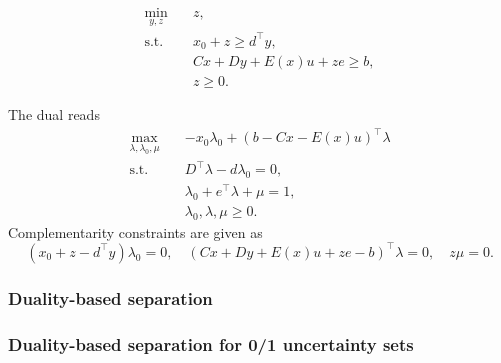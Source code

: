 \begin{subequations}
    \begin{align}
        \min_{y,z} \quad & z, \\
        \text{s.t.} \quad & x_0 + z \ge d^\top y, \\
        & Cx + Dy + E(x)u + ze \ge b, \\
        & z \ge 0.
    \end{align}
\end{subequations}

The dual reads 
\begin{subequations}
    \label{eq:ccg:farkas}
    \begin{align}
        \max_{\lambda,\lambda_0,\mu} \quad & -x_0\lambda_0 + (b - Cx - E(x)u)^\top \lambda \\
        \text{s.t.} \quad & D^\top\lambda - d\lambda_0 = 0, \\
        & \lambda_0 + e^\top\lambda + \mu = 1, \\
        & \lambda_0, \lambda, \mu \ge 0.
    \end{align}
\end{subequations}
Complementarity constraints are given as 
\begin{equation*}
    (x_0 + z - d^\top y)\lambda_0 = 0, \quad 
    (Cx + Dy + E(x)u + ze - b)^\top \lambda = 0, \quad 
    z\mu = 0.
\end{equation*}

\subsubsection*{Duality-based separation}


\subsubsection*{Duality-based separation for 0/1 uncertainty sets} 

